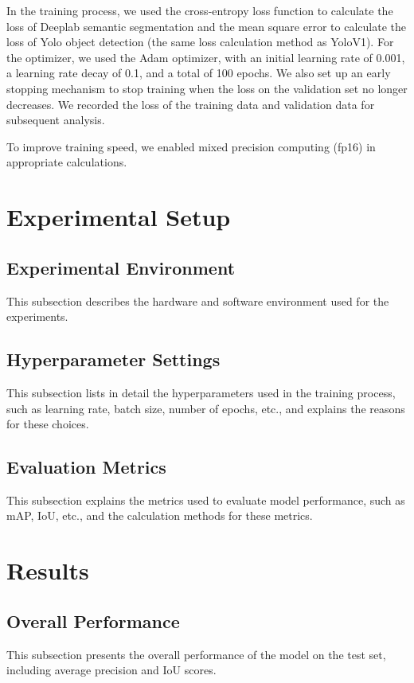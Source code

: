 \documentclass[conference]{IEEEtran}
\begin{document}

In the training process, we used the cross-entropy loss function to calculate the loss of Deeplab semantic segmentation and the mean square error to calculate the loss of Yolo object detection (the same loss calculation method as YoloV1). For the optimizer, we used the Adam optimizer, with an initial learning rate of 0.001, a learning rate decay of 0.1, and a total of 100 epochs. We also set up an early stopping mechanism to stop training when the loss on the validation set no longer decreases. We recorded the loss of the training data and validation data for subsequent analysis.

To improve training speed, we enabled mixed precision computing (fp16) in appropriate calculations.

\section{Experimental Setup}
\subsection{Experimental Environment}
This subsection describes the hardware and software environment used for the experiments.

\subsection{Hyperparameter Settings}
This subsection lists in detail the hyperparameters used in the training process, such as learning rate, batch size, number of epochs, etc., and explains the reasons for these choices.

\subsection{Evaluation Metrics}
This subsection explains the metrics used to evaluate model performance, such as mAP, IoU, etc., and the calculation methods for these metrics.

\section{Results}
\subsection{Overall Performance}
This subsection presents the overall performance of the model on the test set, including average precision and IoU scores.
\end{document}

